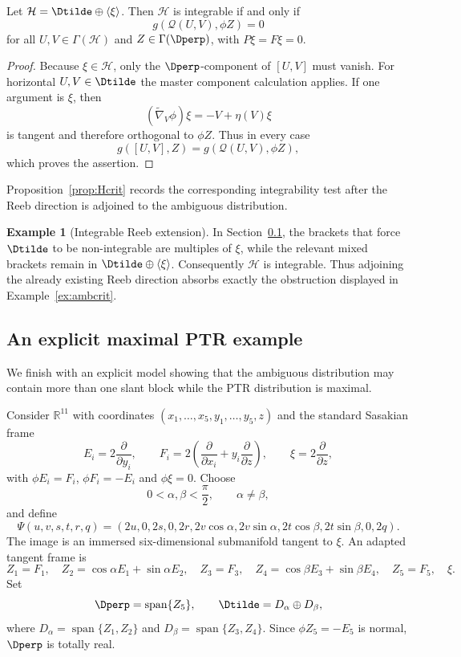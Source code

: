 \documentclass[11pt]{article}
\theoremstyle{definition}\newtheorem{definition}[theorem]{Definition}\newtheorem{example}[theorem]{Example}
\theoremstyle{remark}\newtheorem{remark}[theorem]{Remark}
\begin{document}
\begin{proposition}\label{prop:Hcrit}
Let $\mathcal H=\Dtilde\oplus\langle\xi\rangle$. Then $\mathcal H$ is integrable if and only if
\[
 g(\mathcal Q(U,V),\phi Z)=0
\]
for all $U,V\in\Gamma(\mathcal H)$ and $Z\in\Gamma(\Dperp)$, with $P\xi=F\xi=0$.
\end{proposition}
\begin{proof}
Because \(\xi\in\mathcal H\), only the \(\Dperp\)-component of
\([U,V]\) must vanish.  For horizontal \(U,V\in\Dtilde\) the master
component calculation applies.  If one argument is \(\xi\), then
\[
(\widetilde\nabla_V\phi)\xi=-V+\eta(V)\xi
\]
is tangent and therefore orthogonal to \(\phi Z\).  Thus in every case
\[
g([U,V],Z)=g(\mathcal Q(U,V),\phi Z),
\]
which proves the assertion.
\end{proof}

Proposition~\ref{prop:Hcrit} records the corresponding integrability test
after the Reeb direction is adjoined to the ambiguous distribution.


\begin{example}[Integrable Reeb extension]\label{ex:Hcrit}
In Section~\ref{sec:explicit}, the brackets that force $\Dtilde$ to be non-integrable are multiples of $\xi$, while the relevant mixed brackets remain in $\Dtilde\oplus\langle\xi\rangle$. Consequently $\mathcal H$ is integrable. Thus adjoining the already existing Reeb direction absorbs exactly the obstruction displayed in Example~\ref{ex:ambcrit}.
\end{example}

\subsection{An explicit maximal PTR example}\label{sec:explicit}
We finish with an explicit model showing that the ambiguous distribution may contain more than one slant block while the PTR distribution is maximal.

Consider $\mathbb R^{11}$ with coordinates $(x_1,\ldots,x_5,y_1,\ldots,y_5,z)$ and the standard Sasakian frame
\[
 E_i=2\frac{\partial}{\partial y_i},\qquad
 F_i=2\left(\frac{\partial}{\partial x_i}+y_i\frac{\partial}{\partial z}\right),\qquad
 \xi=2\frac{\partial}{\partial z},
\]
with $\phi E_i=F_i$, $\phi F_i=-E_i$ and $\phi\xi=0$. Choose
\[
 0<\alpha,\beta<\frac\pi2,\qquad \alpha\ne\beta,
\]
and define
\[
 \Psi(u,v,s,t,r,q)=
 (2u,0,2s,0,2r,2v\cos\alpha,2v\sin\alpha,2t\cos\beta,2t\sin\beta,0,2q).
\]
The image is an immersed six-dimensional submanifold tangent to $\xi$. An adapted tangent frame is
\[
 Z_1=F_1,\quad Z_2=\cos\alpha E_1+\sin\alpha E_2,
\quad Z_3=F_3,\quad Z_4=\cos\beta E_3+\sin\beta E_4,
\quad Z_5=F_5,\quad \xi.
\]
Set
\[
 \Dperp=\operatorname{span}\{Z_5\},\qquad
 \Dtilde=D_\alpha\oplus D_\beta,
\]
where $D_\alpha=\operatorname{span}\{Z_1,Z_2\}$ and $D_\beta=\operatorname{span}\{Z_3,Z_4\}$. Since $\phi Z_5=-E_5$ is normal, $\Dperp$ is totally real.
\end{document}
